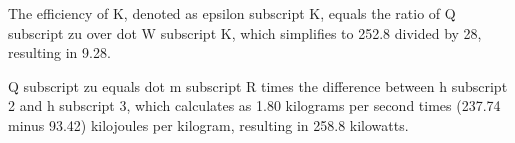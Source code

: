 The efficiency of K, denoted as epsilon subscript K, equals the ratio of Q subscript zu over dot W subscript K, which simplifies to 252.8 divided by 28, resulting in 9.28.

Q subscript zu equals dot m subscript R times the difference between h subscript 2 and h subscript 3, which calculates as 1.80 kilograms per second times (237.74 minus 93.42) kilojoules per kilogram, resulting in 258.8 kilowatts.